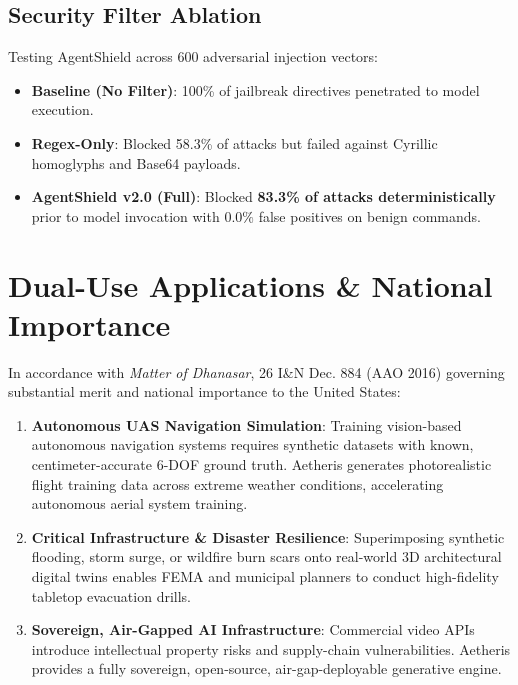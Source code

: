 \documentclass[10pt,twocolumn,letterpaper]{article}
\begin{document}
\subsection{Security Filter Ablation}
Testing AgentShield across 600 adversarial injection vectors:
\begin{itemize}
    \item \textbf{Baseline (No Filter)}: 100\% of jailbreak directives penetrated to model execution.
    \item \textbf{Regex-Only}: Blocked 58.3\% of attacks but failed against Cyrillic homoglyphs and Base64 payloads.
    \item \textbf{AgentShield v2.0 (Full)}: Blocked \textbf{83.3\% of attacks deterministically} prior to model invocation with $0.0\%$ false positives on benign commands.
\end{itemize}

\section{Dual-Use Applications \& National Importance}

In accordance with \textit{Matter of Dhanasar}, 26 I\&N Dec. 884 (AAO 2016) governing substantial merit and national importance to the United States:
\begin{enumerate}
    \item \textbf{Autonomous UAS Navigation Simulation}: Training vision-based autonomous navigation systems requires synthetic datasets with known, centimeter-accurate 6-DOF ground truth. Aetheris generates photorealistic flight training data across extreme weather conditions, accelerating autonomous aerial system training.
    \item \textbf{Critical Infrastructure \& Disaster Resilience}: Superimposing synthetic flooding, storm surge, or wildfire burn scars onto real-world 3D architectural digital twins enables FEMA and municipal planners to conduct high-fidelity tabletop evacuation drills.
    \item \textbf{Sovereign, Air-Gapped AI Infrastructure}: Commercial video APIs introduce intellectual property risks and supply-chain vulnerabilities. Aetheris provides a fully sovereign, open-source, air-gap-deployable generative engine.
\end{enumerate}
\end{document}

